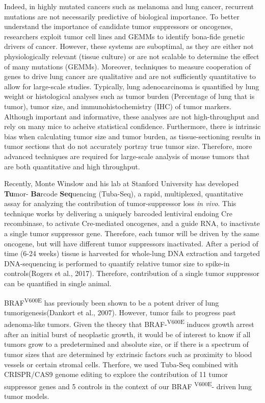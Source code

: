 Indeed, in highly mutated cancers such as melanoma and lung cancer, recurrent mutations are not necessarily predictive of biological importance.
To better understand the importance of candidate tumor suppressors or oncogenes, researchers exploit tumor cell lines and GEMMs to identify bona-fide genetic drivers of cancer.
However, these systems are suboptimal, as they are either not physiologically relevant (tissue culture) or are not scalable to determine the effect of many mutations (GEMMs).
Moreover, techniques to measure cooperation of genes to drive lung cancer are qualitative and are not sufficiently quantitative to allow for large-scale studies.
Typically, lung adenocarcinoma is quantified by lung weight or histological analyses such as tumor burden (Percentage of lung that is tumor), tumor size, and immunohistochemistry (IHC) of tumor markers.
Although important and informative, these analyses are not high-throughput and rely on many mice to acheive statistical confidence. Furthermore, there is intrinsic bias when calculating tumor size and tumor burden, as tissue-sectioning results in tumor sections that do not accurately portray true tumor size. Therefore, more advanced techniques are required for large-scale analysis of mouse tumors that are both quantitative and high throughput.

Recently, Monte Winslow and his lab at Stanford University has developed \textbf{Tu}mor- \textbf{Ba}rcode \textbf{Seq}uencing (Tuba-Seq), a rapid, multiplexed, quantitative assay for analyzing the contribution of tumor-suppressor loss \emph{in vivo}.
This technique works by delivering a uniquely barcoded lentiviral endoing Cre recombinase, to activate Cre-mediated oncogenes, and a guide RNA, to inactivate a single tumor suppressor gene.
Therefore, each tumor will be driven by the same oncogene, but will have different tumor suppressors inactivated.
After a period of time (6-24 weeks) tissue is harvested for whole-lung DNA extraction and targeted DNA-sequencing is performed to quantify relative tumor size to spike-in controls(Rogers et al., 2017).
Therefore, contribution of a single tumor suppressor can be quantified in single animal.

BRAF\textsuperscript{V600E} has previously been shown to be a potent driver of lung tumorigenesis(Dankort et al., 2007).
However, tumor fails to progress past adenoma-like tumors.
Given the theory that BRAF-\textsuperscript{V600E} induces growth arrest after an initial burst of neoplastic growth, it would be of interest to know if all tumors grow to a predetermined and absolute size, or if there is a spectrum of tumor sizes that are determined by extrinsic factors such as proximity to blood vessels or certain stromal cells.
Therfore, we used Tuba-Seq combined with CRISPR/CAS9 genome editing to explore the contribution of 11 tumor suppressor genes and 5 controls in the context of our BRAF \textsuperscript{V600E}- driven lung tumor models.

